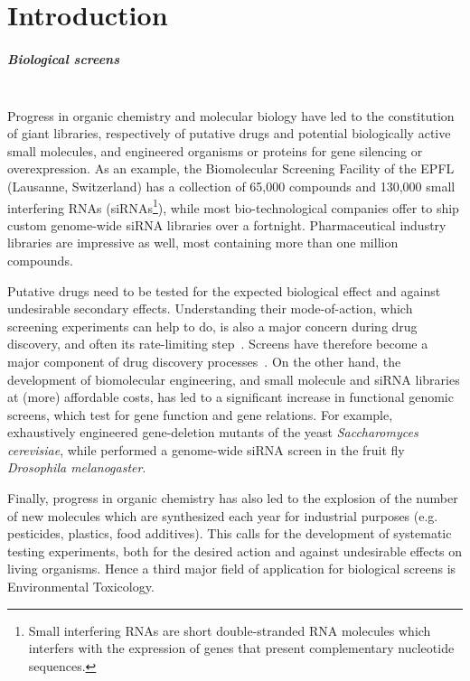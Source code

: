\chapter{Introduction}
\paragraph{Biological screens}~\\
Progress in organic chemistry and molecular biology have led to the constitution of giant libraries, respectively of putative drugs and potential biologically active small molecules, and engineered organisms or proteins for gene silencing or overexpression. As an example, the Biomolecular Screening Facility of the EPFL (Lausanne, Switzerland) has a collection of 65,000 compounds and 130,000 small interfering RNAs (siRNAs\footnote{Small interfering RNAs are short double-stranded RNA molecules which interfers with the expression of genes that present complementary nucleotide sequences.}), while most bio-technological companies offer to ship custom genome-wide siRNA libraries over a fortnight. Pharmaceutical industry libraries are impressive as well, most containing more than one million compounds.

Putative drugs need to be tested for the expected biological effect and against undesirable secondary effects. Understanding their mode-of-action, which screening experiments can help to do, is also a major concern during drug discovery, and often its rate-limiting step~\cite{pmid15547975}. Screens have therefore become a major component of drug discovery processes~\cite{pmid22155864}. On the other hand, the development of biomolecular engineering, and small molecule and siRNA libraries at (more) affordable costs, has led to a significant increase in functional genomic screens, which test for gene function and gene relations. For example, \cite{pmid12140549} exhaustively engineered gene-deletion mutants of the yeast \textit{Saccharomyces cerevisiae}, while \cite{pmid16511445} performed a genome-wide siRNA screen in the fruit fly \textit{Drosophila melanogaster}.

Finally, progress in organic chemistry has also led to the explosion of the number of new molecules which are synthesized each year for industrial purposes (e.g. pesticides, plastics, food additives). This calls for the development of systematic testing experiments, both for the desired action and against undesirable effects on living organisms. Hence a third major field of application for biological screens is Environmental Toxicology.

